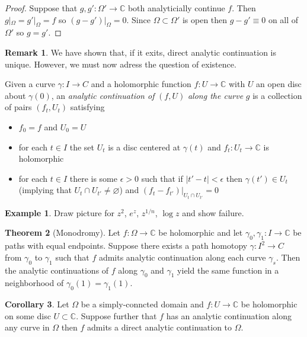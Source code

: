 \documentclass[12pt]{extarticle}
\newcommand{\C}{\mathbb{C}}
\theoremstyle{definition}
\newtheorem{theorem}{Theorem}[section]
\newtheorem{example}[theorem]{Example}
\newtheorem{corollary}[theorem]{Corollary}
\newtheorem{remark}{Remark}
\newenvironment{definition}[1][Definition:]{\begin{trivlist}
\item[\hskip \labelsep {\bfseries #1}]}{\end{trivlist}}
\begin{document}
\begin{proof}
Suppose that $g, g' : \Omega' \to \C$ both analyticially continue $f$. Then $g|_\Omega = g'|_\Omega = f$ so $(g - g')|_\Omega = 0$. Since $\Omega \subset \Omega'$ is open then $g - g' \equiv 0$ on all of $\Omega'$ so $g = g'$.
\end{proof}

\begin{remark}
We have shown that, if it exits, direct analytic continuation is unique. However, we must now adress the question of existence.
\end{remark}

\begin{definition}
Given a curve $\gamma : I \to C$ and a holomorphic function $f : U \to \C$ with $U$ an open disc about $\gamma(0)$, an \textit{analytic continuation of} $(f, U)$ \textit{along the curve} $g$ is a collection of pairs $(f_t, U_t)$ satisfying
\begin{itemize}
\item $f_0 = f$ and $U_0 = U$
\item for each $t \in I$ the set $U_t$ is a disc centered at $\gamma(t)$ and $f_t : U_t \to \C$ is holomorphic
\item for each $t \in I$ there is some $\epsilon > 0$ such that if $|t' - t| < \epsilon$ then $\gamma(t') \in U_t$ (implying that $U_t \cap U_{t'} \neq \varnothing$) and $(f_t - f_{t'})|_{U_t \cap U_{t'}} = 0$
\end{itemize}
\end{definition}

\begin{example}
Draw picture for $z^2$, $e^z$, $z^{1/n}$, $\log{z}$ and show failure.
\end{example}

\begin{theorem}[Monodromy]
Let $f : \Omega \to \C$ be holomorphic and let $\gamma_0, \gamma_1 : I \to \C$ be paths with equal endpoints. Suppose there exists a path homotopy $\gamma : I^2 \to C$ from $\gamma_0$ to $\gamma_1$ such that $f$ admits analytic continuation along each curve $\gamma_s$. Then the analytic continuations of $f$ along $\gamma_0$ and $\gamma_1$ yield the same function in a neighborhood of $\gamma_0(1) = \gamma_1(1)$. 
\end{theorem}


\begin{corollary}
Let $\Omega$ be a simply-conncted domain and $f : U \to \C$ be holomorphic on some disc $U \subset \C$. Suppose further that $f$ has an analytic continuation along any curve in $\Omega$ then $f$ admits a direct analytic continuation to $\Omega$.
\end{corollary}
\end{document}
